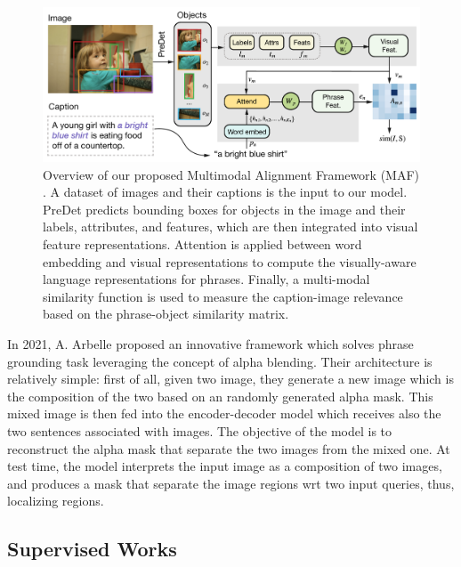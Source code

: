 \begin{figure}
  \centering
  \includegraphics[width=.8\textwidth]{figures/maf-model.png}
  \caption[Multimodal Alignment Framework model overview]{Overview
  of our proposed Multimodal Alignment Framework (MAF)
  \cite{wang2020maf}. A dataset of images and their captions is the
  input to our model. PreDet predicts bounding boxes for objects in
  the image and their labels, attributes, and features, which are
  then integrated into visual feature representations. Attention is
  applied between word embedding and visual representations to
  compute the visually-aware language representations for phrases.
  Finally, a multi-modal similarity function is used to measure the
  caption-image relevance based on the phrase-object similarity
  matrix.}
  \label{fig:maf-model}
\end{figure}

In 2021, A. Arbelle \etal{} \cite{arbelle2021detector} proposed an
innovative framework which solves phrase grounding task leveraging the
concept of alpha blending. Their architecture is relatively simple:
first of all, given two image, they generate a new image which is the
composition of the two based on an randomly generated alpha mask. This
mixed image is then fed into the encoder-decoder model which receives
also the two sentences associated with images. The objective of the
model is to reconstruct the alpha mask that separate the two images
from the mixed one. At test time, the model interprets the input image
as a composition of two images, and produces a mask that separate the
image regions wrt two input queries, thus, localizing regions.

\subsection{Supervised Works}
\label{subsec:related-full-grounding}

